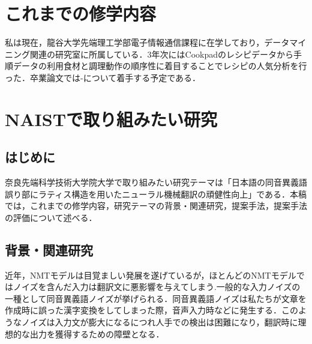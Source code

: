 \documentclass[a4j,10.5pt, twocolumn]{jarticle}
\begin{document}


\section{これまでの修学内容}
私は現在，龍谷大学先端理工学部電子情報通信課程に在学しており，データマイニング関連の研究室に所属している．3年次にはCookpadのレシピデータから手順データの利用食材と調理動作の順序性に着目することでレシピの人気分析を行った．卒業論文では-について着手する予定である．
\section{NAISTで取り組みたい研究}
\subsection{はじめに}
奈良先端科学技術大学院大学で取り組みたい研究テーマは「日本語の同音異義語誤り部にラティス構造を用いたニューラル機械翻訳の頑健性向上」である．本稿では，これまでの修学内容，研究テーマの背景・関連研究，提案手法，提案手法の評価について述べる．

\subsection{背景・関連研究}
近年，NMTモデルは目覚ましい発展を遂げているが，ほとんどのNMTモデルではノイズを含んだ入力は翻訳文に悪影響を与えてしまう\cite{Belinkov}.一般的な入力ノイズの一種として同音異義語ノイズが挙げられる．同音異義語ノイズは私たちが文章を作成時に誤った漢字変換をしてしまった際，音声入力時などに発生する．このようなノイズは入力文が膨大になるにつれ人手での検出は困難になり，翻訳時に理想的な出力を獲得するための障壁となる．
\end{document}
